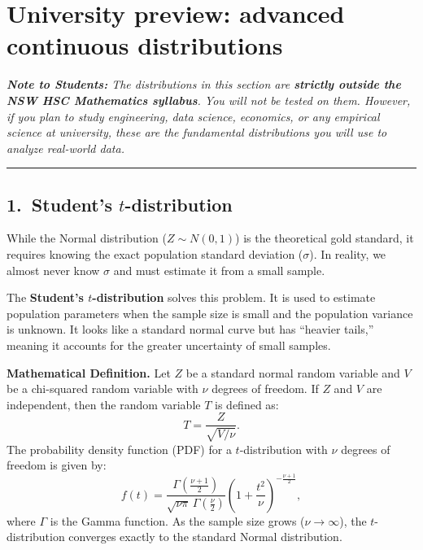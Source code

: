 \section{University preview: advanced continuous distributions}

\noindent
\textit{\textbf{Note to Students:} The distributions in this section are \textbf{strictly outside the NSW HSC Mathematics syllabus}. You will not be tested on them. However, if you plan to study engineering, data science, economics, or any empirical science at university, these are the fundamental distributions you will use to analyze real-world data.}

\vspace{0.5cm}
\noindent\rule{\textwidth}{0.5pt}
\vspace{0.5cm}

\subsection*{1.\ Student's $t$-distribution}

While the Normal distribution ($Z \sim N(0,1)$) is the theoretical gold standard, it requires knowing the exact population standard deviation ($\sigma$). In reality, we almost never know $\sigma$ and must estimate it from a small sample.

The \textbf{Student's $t$-distribution} solves this problem. It is used to estimate population parameters when the sample size is small and the population variance is unknown. It looks like a standard normal curve but has ``heavier tails,'' meaning it accounts for the greater uncertainty of small samples.

\textbf{Mathematical Definition.}
Let $Z$ be a standard normal random variable and $V$ be a chi-squared random variable with $\nu$ degrees of freedom. If $Z$ and $V$ are independent, then the random variable $T$ is defined as:
\[
    T = \frac{Z}{\sqrt{V/\nu}}.
\]
The probability density function (PDF) for a $t$-distribution with $\nu$ degrees of freedom is given by:
\[
    f(t) = \frac{\Gamma\left(\frac{\nu+1}{2}\right)}{\sqrt{\nu\pi} \, \Gamma\left(\frac{\nu}{2}\right)} \left(1 + \frac{t^2}{\nu}\right)^{-\frac{\nu+1}{2}},
\]
where $\Gamma$ is the Gamma function. As the sample size grows ($\nu \to \infty$), the $t$-distribution converges exactly to the standard Normal distribution.

\vspace{0.5cm}


